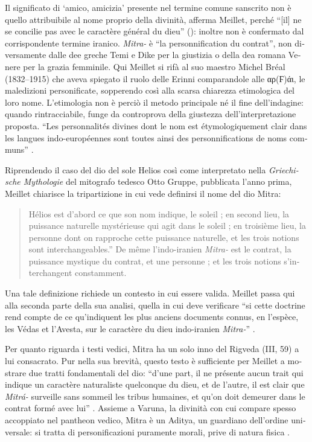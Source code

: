 \documentclass[french,output=paper,colorlinks,citecolor=brown]{../langscibook}
\begin{document}
\begin{otherlanguage}{italian}
Il significato di ‘amico, amicizia’ presente nel termine comune sanscrito non è quello attribuibile al nome proprio della divinità, afferma Meillet, perché “[il] ne se concilie pas avec le caractère général du dieu” (\citealt[145]{Meillet1907}): inoltre non è confermato dal corrispondente termine iranico. \textit{Mitra-} è “la personnification du contrat”, non diversamente dalle dee greche Temi e Dike per la giustizia o della dea romana Venere per la grazia femminile. Qui Meillet si rifà al suo maestro Michel Bréal (1832--1915) che aveva spiegato il ruolo delle Erinni comparandole alle αρ(Ϝ)άι, le maledizioni personificate, sopperendo così alla scarsa chiarezza etimologica del loro nome. L’etimologia non è perciò il metodo principale né il fine dell’indagine: quando rintracciabile, funge da controprova della giustezza dell’interpretazione proposta. “Les personnalités divines dont le nom est étymologiquement clair dans les langues indo-européennes sont toutes ainsi des personnifications de noms communs” \citep[145--146]{Meillet1907}.

Riprendendo il caso del dio del sole Helios così come interpretato nella \textit{Griechische Mythologie} del mitografo tedesco Otto Gruppe, pubblicata l’anno prima, Meillet chiarisce la tripartizione in cui vede definirsi il nome del dio Mitra:

\begin{quote}
    Hélios est d’abord ce que son nom indique, le soleil ; en second lieu, la puissance naturelle mystérieuse qui agit dans le soleil ; en troisième lieu, la personne dont on rapproche cette puissance naturelle, et les trois notions sont interchangeables.” De même l’indo-iranien \textit{Mitra-} est le contrat, la puissance mystique du contrat, et une personne ; et les trois notions s’interchangent constamment. \citep[146]{Meillet1907}
\end{quote}

Una tale definizione richiede un contesto in cui essere valida. Meillet passa qui alla seconda parte della sua analisi, quella in cui deve verificare “si cette doctrine rend compte de ce qu’indiquent les plus anciens documents connus, en l’espèce, les Védas et l’Avesta, sur le caractère du dieu indo-iranien \textit{Mitra-}” \citep[146]{Meillet1907}.

Per quanto riguarda i testi vedici, Mitra ha un solo inno del Rigveda (III, 59) a lui consacrato. Pur nella sua brevità, questo testo è sufficiente per Meillet a mostrare due tratti fondamentali del dio: “d’une part, il ne présente aucun trait qui indique un caractère naturaliste quelconque du dieu, et de l’autre, il est clair que \textit{Mitrá-} surveille sans sommeil les tribus humaines, et qu’on doit demeurer dans le contrat formé avec lui” \citep[147]{Meillet1907}. Assieme a Varuna, la divinità con cui compare spesso accoppiato nel pantheon vedico, Mitra è un Aditya, un guardiano dell’ordine universale: si tratta di personificazioni puramente morali, prive di natura fisica \citep[147]{Meillet1907}. 


\end{otherlanguage}
\end{document}
